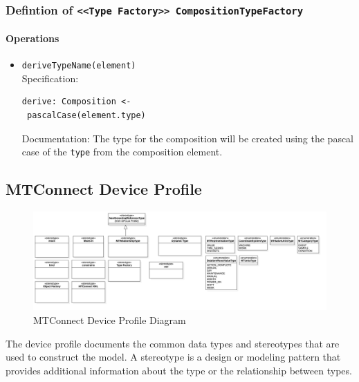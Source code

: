 \FloatBarrier
\subsubsection{Defintion of \texttt{<<Type Factory>> CompositionTypeFactory}} \label{type:CompositionTypeFactory}

\FloatBarrier



\paragraph{Operations}
\begin{itemize}
  \item \texttt{deriveTypeName(element)}\\
    Specification:
   \indent \begin{lstlisting}
derive: Composition <-
 pascalCase(element.type)
\end{lstlisting}

    Documentation: The type for the composition will be created using the pascal case of the \texttt{type} from the composition element.

\end{itemize}
\FloatBarrier
\subsection{MTConnect Device Profile} \label{model:MTConnectDeviceProfile}

\begin{figure}[ht]
  \centering
    \includegraphics[width=1.0\textwidth]{./diagrams/MTConnectDeviceProfile.png}
  \caption{MTConnect Device Profile Diagram}
  \label{fig:MTConnectDeviceProfile}
\end{figure}

\FloatBarrier


The device profile documents the common data types and stereotypes that are 
used to construct the model. A stereotype is a design or modeling pattern that 
provides additional information about the type or the relationship between types. 

